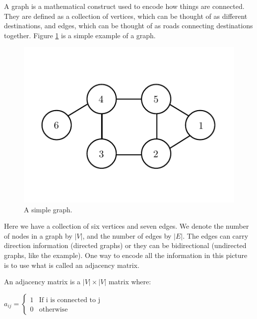 

A graph is a mathematical construct used to encode how things are connected.
They are defined as a collection of vertices, which can be thought of as different destinations, and edges, which can be thought of as roads connecting destinations together.
Figure \ref{segmentation:graph} is a simple example of a graph.

\begin{figure}
\includegraphics[scale=0.75]{graphExample}
\caption{A simple graph.}
\label{segmentation:graph}
\end{figure}

Here we have a collection of six vertices and seven edges.
We denote the number of nodes in a graph by $|V|$, and the number of edges by $|E|$.
The edges can carry direction information (directed graphs) or they can be bidirectional (undirected graphs, like the example).
One way to encode all the information in this picture is to use what is called an adjacency matrix.

\begin{definition} An adjacency matrix is a $|V| \times |V|$ matrix where:
\begin{center}
	$a_{ij} = \begin{cases} 1 & \mbox{If i is connected to j} \\ 0 & \mbox{otherwise} \end{cases}$
\end{center}

\end{definition}

